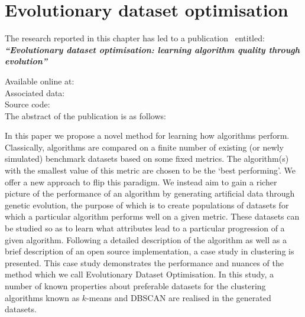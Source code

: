 \chapter{Evolutionary dataset optimisation}
\label{chp:edo}

\graphicspath{{chapters/edo/paper/img/}}
\renewcommand{\tikzpath}{chapters/edo/paper/tex/diagrams}
\renewcommand{\algpath}{chapters/edo/paper/tex/algorithms}

\begin{center}
    The research reported in this chapter has led to a
    publication~\cite{Wilde2020:edo} entitled:\\[1em]

    {%
        \bf\itshape{``Evolutionary dataset optimisation: learning algorithm
                    quality through evolution''}
    }

    Available online at:~\\
    Associated data:~\\
    Source code:~\\[1em]

    The abstract of the publication is as follows:\\[1em]
\end{center}

In this paper we propose a novel method for learning how algorithms perform.
Classically, algorithms are compared on a finite number of existing (or newly
simulated) benchmark datasets based on some fixed metrics. The algorithm(s) with
the smallest value of this metric are chosen to be the `best performing'. We
offer a new approach to flip this paradigm. We instead aim to gain a richer
picture of the performance of an algorithm by generating artificial data through
genetic evolution, the purpose of which is to create populations of datasets for
which a particular algorithm performs well on a given metric. These datasets can
be studied so as to learn what attributes lead to a particular progression of a
given algorithm. Following a detailed description of the algorithm as well as a
brief description of an open source implementation, a case study in clustering
is presented. This case study demonstrates the performance and nuances of the
method which we call Evolutionary Dataset Optimisation. In this study, a number
of known properties about preferable datasets for the clustering algorithms
known as \(k\)-means and DBSCAN are realised in the generated datasets.

